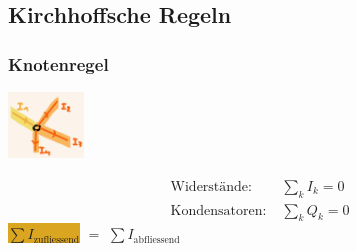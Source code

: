 \subsection{Kirchhoffsche Regeln}
    \subsubsection{Knotenregel}
        \vspace{-1mm}
        \begin{minipage}{0.49\linewidth}
            \begin{footnotesize}
                \begin{center}
                    \vspace{2mm}
                    \includegraphics[width = 20mm]{src/images/knotenregel.png}
                \end{center}
            \end{footnotesize}
        \end{minipage}
        \begin{minipage}{0.5\linewidth}
            \begin{scriptsize}
                \begin{center}
                    \begin{align*}
                        \text{Widerstände:} \; &\sum\limits_k I_k = 0\\
                        \text{Kondensatoren:} \; &\sum\limits_k Q_k = 0
                    \end{align*}
                    \colorbox{Goldenrod}{$\sum I_\text{zufliessend}$} $=$ \colorbox{Apricot}{$\sum I_\text{abfliessend}$} 
                \end{center}
            \end{scriptsize}
        \end{minipage}
        \vspace{1mm}

